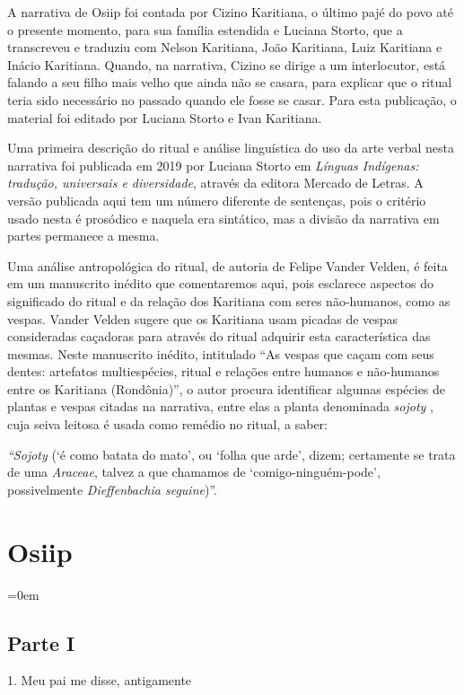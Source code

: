 A narrativa de Osiip foi contada por Cizino Karitiana, o último pajé do
povo até o presente momento, para sua família estendida e Luciana
Storto, que a transcreveu e traduziu com Nelson Karitiana, João
Karitiana, Luiz Karitiana e Inácio Karitiana. Quando, na narrativa,
Cizino se dirige a um interlocutor, está falando a seu filho mais velho
que ainda não se casara, para explicar que o ritual teria sido
necessário no passado quando ele fosse se casar. Para esta publicação, o
material foi editado por Luciana Storto e Ivan Karitiana.

Uma primeira descrição do ritual e análise linguística do uso da arte
verbal nesta narrativa foi publicada em 2019 por Luciana Storto em
\emph{Línguas Indígenas: tradução, universais e diversidade}, através da
editora Mercado de Letras. A versão publicada aqui tem um número
diferente de sentenças, pois o critério usado nesta é prosódico e
naquela era sintático, mas a divisão da narrativa em partes permanece a
mesma.

Uma análise antropológica do ritual, de autoria de Felipe Vander Velden,
é feita em um manuscrito inédito que comentaremos aqui, pois esclarece
aspectos do significado do ritual e da relação dos Karitiana com seres
não-humanos, como as vespas. Vander Velden sugere que os Karitiana usam
picadas de vespas consideradas caçadoras para através do ritual adquirir
esta característica das mesmas. Neste manuscrito inédito, intitulado
``As vespas que caçam com seus dentes: artefatos multiespécies, ritual e
relações entre humanos e não-humanos entre os Karitiana (Rondônia)'', o
autor procura identificar algumas espécies de plantas e vespas citadas
na narrativa, entre elas a planta denominada \emph{sojoty} , cuja seiva
leitosa é usada como remédio no ritual, a saber:

\emph{``Sojoty} (`é como batata do mato', ou `folha que arde',
dizem; certamente se trata de uma \emph{Araceae}, talvez a que chamamos
de `comigo-ninguém-pode', possivelmente \emph{Dieffenbachia
seguine})''.

\chapter*{Osiip}
\begingroup\parindent=0em

\section{Parte I}

1. Meu pai me disse, antigamente

